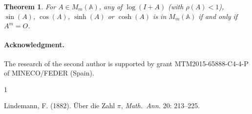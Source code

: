 \documentclass[11pt,a4paper]{article}
\newcommand{\A}{\mathbb{A}}
\newtheorem{theorem}{Theorem}
\begin{document}


\begin{theorem}
For $A \in M_m(\A)$, any of\/ $\log(I+A)$ (with $\rho(A)<1$), $\sin(A)$, $\cos(A)$,
$\sinh(A)$ or $\cosh(A)$ is in $M_{m}(\A)$ if and only if $A^{m}=O$.
\end{theorem}

\paragraph*{Acknowledgment.}
The research of the second author is supported by grant MTM2015-65888-C4-4-P of MINECO/FEDER (Spain).

\begin{thebibliography}{1}

Lindemann, F. (1882). \"Uber die Zahl $\pi$, \textit{Math.\ Ann.} 20: 213--225.

\end{thebibliography}
\end{document}
